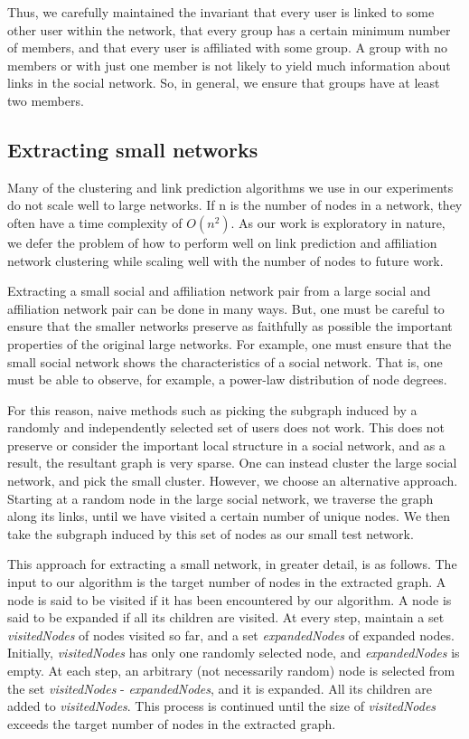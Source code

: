 \documentclass{report}
\begin{document}
Thus, we carefully maintained the invariant that every user is linked to some other user within the network, that every group has a certain minimum number of members, and that every user is affiliated with some group. A group with no members or with just one member is not likely to yield much information about links in the social network. So, in general, we ensure that groups have at least two members.

\subsection{Extracting small networks}
Many of the clustering and link prediction algorithms we use in our experiments do not scale well to large networks. If n is the number of nodes in a network, they often have a time complexity of $O(n^{2})$. As our work is exploratory in nature, we defer the problem of how to perform well on link prediction and affiliation network clustering while scaling well with the number of nodes to future work.

Extracting a small social and affiliation network pair from a large social and affiliation network pair can be done in many ways. But, one must be careful to ensure that the smaller networks preserve as faithfully as possible the important properties of the original large networks. For example, one must ensure that the small social network shows the characteristics of a social network. That is, one must be able to observe, for example, a power-law distribution of node degrees.

For this reason, naive methods such as picking the subgraph induced by a randomly and independently selected set of users does not work. This does not preserve or consider the important local structure in a social network, and as a result, the resultant graph is very sparse. One can instead cluster the large social network, and pick the small cluster. However, we choose an alternative approach. Starting at a random node in the large social network, we traverse the graph along its links, until we have visited a certain number of unique nodes. We then take the subgraph induced by this set of nodes as our small test network.

This approach for extracting a small network, in greater detail, is as follows. The input to our algorithm is the target number of nodes in the extracted graph. A node is said to be visited if it has been encountered by our algorithm. A node is said to be expanded if all its children are visited. At every step, maintain a set \textit{visitedNodes} of nodes visited so far, and a set \textit{expandedNodes} of expanded nodes. Initially, \textit{visitedNodes} has only one randomly selected node, and \textit{expandedNodes} is empty. At each step, an arbitrary (not necessarily random) node is selected from the set \textit{visitedNodes} - \textit{expandedNodes}, and it is expanded. All its children are added to \textit{visitedNodes}. This process is continued until the size of \textit{visitedNodes} exceeds the target number of nodes in the extracted graph.
\end{document}
